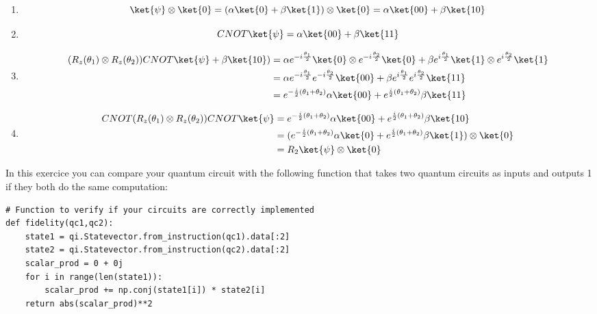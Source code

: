 \begin{enumerate}
    \item $$\ket{\psi}\otimes\ket{0}=(\alpha\ket{0}+\beta\ket{1})\otimes\ket{0}=\alpha\ket{00}+\beta\ket{10}$$
    \item $$CNOT\ket{\psi}=\alpha\ket{00}+\beta\ket{11}$$
    \item
    \begin{equation*}
        \begin{split}
            (R_z(\theta_1)\otimes R_z(\theta_2))CNOT\ket{\psi}+\beta\ket{10})&=\alpha e^{-i\frac{\theta_1}{2}}\ket{0}\otimes e^{-i\frac{\theta_2}{2}}\ket{0}+\beta e^{i\frac{\theta_1}{2}}\ket{1}\otimes e^{i\frac{\theta_2}{2}}\ket{1} \\
            &= \alpha e^{-i\frac{\theta_1}{2}} e^{-i\frac{\theta_2}{2}}\ket{00}+\beta e^{i\frac{\theta_1}{2}} e^{i\frac{\theta_2}{2}}\ket{11} \\
            &= e^{-\frac{i}{2}(\theta_1+\theta_2)}\alpha\ket{00} + e^{\frac{i}{2}(\theta_1+\theta_2)}\beta\ket{11}
        \end{split}
    \end{equation*}
    \item
    \begin{equation*}
        \begin{split}
            CNOT (R_z(\theta_1)\otimes R_z(\theta_2))CNOT\ket{\psi} &= e^{-\frac{i}{2}(\theta_1+\theta_2)}\alpha\ket{00} + e^{\frac{i}{2}(\theta_1+\theta_2)}\beta\ket{10} \\
            &= (e^{-\frac{i}{2}(\theta_1+\theta_2)}\alpha\ket{0} + e^{\frac{i}{2}(\theta_1+\theta_2)}\beta\ket{1})\otimes \ket{0} \\
            &= R_2\ket{\psi} \otimes \ket{0}
        \end{split}
    \end{equation*}
\end{enumerate}

In this exercice you can compare your quantum circuit with the following function that takes two quantum circuits as inputs and outputs 1 if they both do the same computation:
\begin{verbatim}
# Function to verify if your circuits are correctly implemented
def fidelity(qc1,qc2):
    state1 = qi.Statevector.from_instruction(qc1).data[:2]
    state2 = qi.Statevector.from_instruction(qc2).data[:2]
    scalar_prod = 0 + 0j
    for i in range(len(state1)):
        scalar_prod += np.conj(state1[i]) * state2[i]
    return abs(scalar_prod)**2
\end{verbatim}


